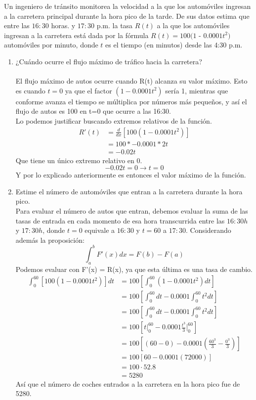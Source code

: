 \documentclass[12pt]{article}
\begin{document}
Un ingeniero de tránsito monitorea la velocidad a la que los automóviles ingresan a la carretera principal durante la hora pico de la tarde. De sus datos estima que entre las $16:30$ horas. y $17:30$ p.m. la tasa  $R(t)$ a la que los automóviles ingresan a la carretera está dada por la fórmula $R(t) = 100 (1$ - $0.0001t^2 )$ automóviles por minuto, donde $t$ es el tiempo (en minutos) desde las 4:30 p.m.
\begin{enumerate}[label=(\alph*)]
\item ¿Cuándo ocurre el flujo máximo de tráfico hacia la carretera?\\\\
  El flujo máximo de autos ocurre cuando R(t) alcanza su valor máximo. Esto es cuando $t=0$ ya que el factor  $(1 - 0.0001t^2 ) $ sería 1, mientras que conforme avanza el tiempo se múltiplica por números más pequeños, y así el flujo de autos es 100 en t=0 que ocurre a las 16:30. \\
Lo podemos justificar buscando extremos relativos de la función.\\
  \begin{align*}
    R'(t)
    & = \frac{d}{dx} [100 (1 - 0.0001t^2 )] \\
    &= 100 *- 0.0001 * 2t\\
    & = -0.02t
  \end{align*}
  Que tiene un único extremo relativo en 0.
  \[ -0.02t = 0 \rightarrow t = 0 \]
  Y por lo explicado anteriormente es entonces el valor máximo de la función.
  
\item Estime el número de automóviles que entran a la carretera durante la hora pico.\\
  Para evaluar el número de autos que entran, debemos evaluar la suma de las tasas de entrada en cada momento de esa hora transcurrida entre las $16:30 h$ y $17:30 h$, donde  $t=0$ equivale a $16:30$ y $t=60$ a $17:30$. Considerando además la proposición:
  \[ \int_a^{b} F'(x)dx = F(b)-F(a)\]
Podemos evaluar con F'(x) = R(x), ya que esta última es una tasa de cambio.
\begin{align*}
  \int_0^{60} \left[ 100 (1- 0.0001t^2) \right] dt
  & = 100 \left[ \int_0^{60}  (1- 0.0001t^2) dt \right]\\
  & =  100 \left[ \int_0^{60}dt - 0.0001 \int_0^{60} t^2 dt \right]\\
  & =  100 \left[ \int_0^{60}dt - 0.0001 \int_0^{60} t^2 dt \right]\\
  & =  100 \left[ t \Bigg|_0 ^{60} - 0.0001 \frac {t^3}{3} \Bigg|_0 ^{60} \right]\\
  & =  100 \left[ (60-0) - 0.0001 \left( \frac {60^3}{3}  -  \frac {0^3}{3} \right) \right]\\
  & =  100 \left[ 60 - 0.0001 ( 72000 ) \right]\\
  & =  100 \cdot 52.8\\
  & =   5280
\end{align*}
Así que el número de coches entrados a la carretera en la hora pico fue de 5280.
\end{enumerate}
\end{document}
